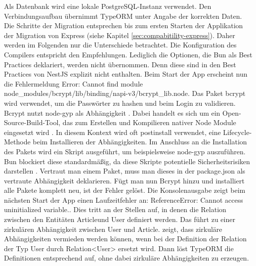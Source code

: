 \noindent
Als Datenbank wird eine lokale PostgreSQL-Instanz verwendet. Den Verbindungsaufbau übernimmt TypeORM unter Angabe der korrekten Daten. Die Schritte der Migration entsprechen bis zum ersten Starten der Applikation der Migration von Express (siehe Kapitel \ref{sec:compabitility-express}). Daher werden im Folgenden nur die Unterschiede betrachtet. Die Konfiguration des Compilers entspricht den Empfehlungen. Lediglich die Optionen, die Bun als Best Practices deklariert, werden nicht übernommen. Denn diese sind in den Best Practices von NestJS explizit nicht enthalten. \newline
Beim Start der App erscheint nun die Fehlermeldung \glqq Error: Cannot find module node\_modules/bcrypt/lib/binding/napi-v3/bcrypt\_lib.node\grqq{}. Das Paket \glqq bcrypt\grqq{} wird verwendet, um die Passwörter zu hashen und beim Login zu validieren. Bcrypt nutzt node-gyp als Abhängigkeit \cite{DelGobbo.2018}. Dabei handelt es sich um ein Open-Source-Build-Tool, das zum Erstellen und Kompilieren nativer Node Module eingesetzt wird \cite{OpenJSFoundation.o.J.b}. In diesem Kontext wird oft \glqq postinstall\grqq{} verwendet, eine Lifecycle-Methode beim Installieren der Abhängigkeiten. Im Anschluss an die Installation des Pakets wird ein Skript ausgeführt, um beispielsweise node-gyp auszuführen. Bun blockiert diese standardmäßig, da diese Skripte potentielle Sicherheitsrisiken darstellen \cite{OvenSh.2023}. Vertraut man einem Paket, muss man dieses in der \glqq package.json\grqq{} als vertraute Abhängigkeit deklarieren. Fügt man nun Bcrypt hinzu und installiert alle Pakete komplett neu, ist der Fehler gelöst. \newline
Die Konsolenausgabe zeigt beim nächsten Start der App einen Laufzeitfehler an: \glqq ReferenceError: Cannot access uninitialized variable.\grqq{}. Dies tritt an der Stellen auf, in denen die Relation zwischen den Entitäten \glqq Article\grqq{}und \glqq User\grqq{} definiert werden. Das führt zu einer zirkulären Abhängigkeit zwischen \glqq User\grqq{} und \glqq Article\grqq{}. \cite{TypeORM.} zeigt, dass zirkuläre Abhängigkeiten vermieden werden können, wenn bei der Definition der Relation der Typ \glqq User\grqq{} durch \glqq Relation<User>\grqq{} ersetzt wird. Dann löst TypeORM die Definitionen entsprechend auf, ohne dabei zirkuläre Abhängigkeiten zu erzeugen.\\

